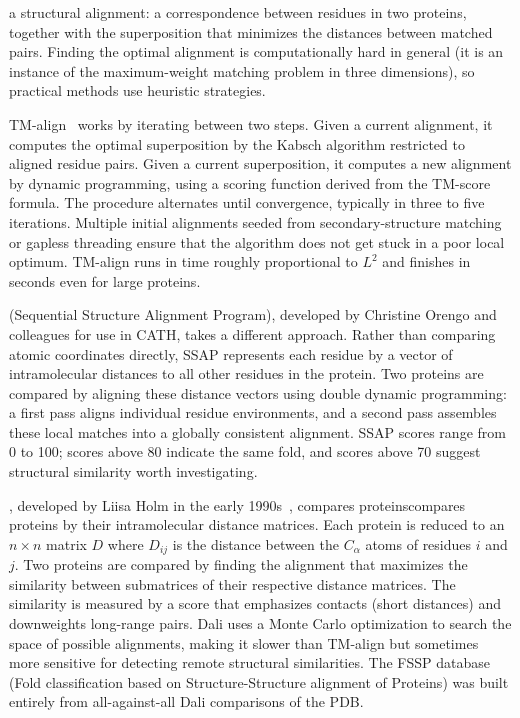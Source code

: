  a structural alignment: a correspondence
between residues in two proteins, together with the superposition that minimizes
the distances between matched pairs. Finding the optimal alignment is
computationally hard in general (it is an instance of the maximum-weight matching
problem in three dimensions), so practical methods use heuristic strategies.

TM-align~\cite{zhang2005} works by iterating between two steps. Given a current
alignment, it computes the optimal superposition by the Kabsch algorithm
restricted to aligned residue pairs. Given a current superposition, it computes a
new alignment by dynamic programming, using a scoring function derived from the
TM-score formula. The procedure alternates until convergence, typically in three
to five iterations. Multiple initial alignments seeded from secondary-structure
matching or gapless threading ensure that the algorithm does not get stuck in a
poor local optimum. TM-align runs in time roughly proportional to $L^2$ and
finishes in seconds even for large proteins.

 (Sequential Structure Alignment Program), developed by Christine
Orengo and colleagues for use in CATH, takes a different approach. Rather than
comparing atomic coordinates directly, SSAP represents each residue by a vector of
intramolecular distances to all other residues in the protein. Two proteins are
compared by aligning these distance vectors using double dynamic programming: a
first pass aligns individual residue environments, and a second pass assembles
these local matches into a globally consistent alignment. SSAP scores range from 0
to 100; scores above 80 indicate the same fold, and scores above 70 suggest
structural similarity worth investigating.

, developed by Liisa Holm in the early 1990s~\cite{holm1993}, compares proteinscompares proteins
by their intramolecular distance matrices. Each protein is reduced to an
$n \times n$ matrix $D$ where $D_{ij}$ is the distance between the $C_\alpha$
atoms of residues $i$ and $j$. Two proteins are compared by finding the alignment
that maximizes the similarity between submatrices of their respective distance
matrices. The similarity is measured by a score that emphasizes contacts (short
distances) and downweights long-range pairs. Dali uses a Monte Carlo optimization
to search the space of possible alignments, making it slower than TM-align but
sometimes more sensitive for detecting remote structural similarities. The FSSP
database (Fold classification based on Structure-Structure alignment of Proteins)
was built entirely from all-against-all Dali comparisons of the PDB.

